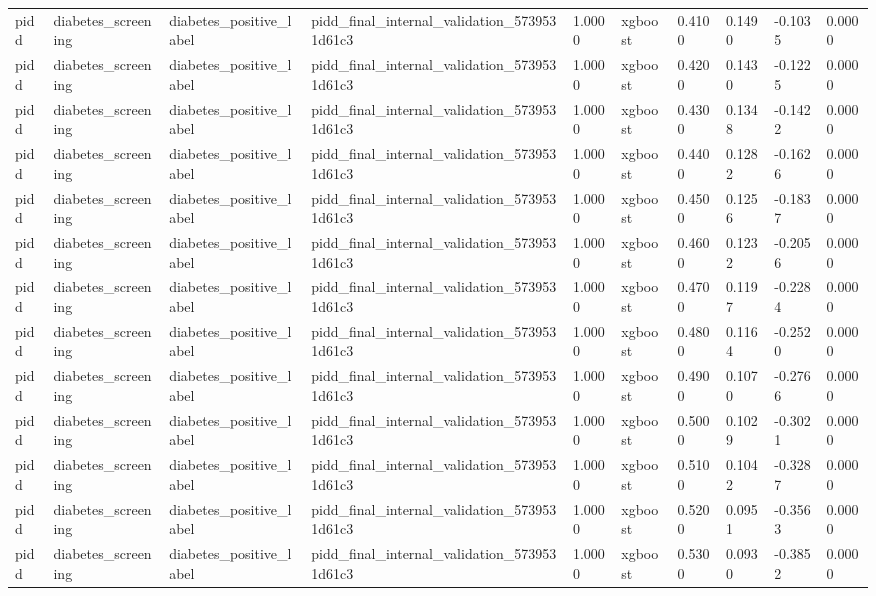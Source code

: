 \begin{tabular}{llllllllll}
pidd & diabetes\_screening & diabetes\_positive\_label & pidd\_final\_internal\_validation\_5739531d61c3 & 1.0000 & xgboost & 0.4100 & 0.1490 & -0.1035 & 0.0000 \\
pidd & diabetes\_screening & diabetes\_positive\_label & pidd\_final\_internal\_validation\_5739531d61c3 & 1.0000 & xgboost & 0.4200 & 0.1430 & -0.1225 & 0.0000 \\
pidd & diabetes\_screening & diabetes\_positive\_label & pidd\_final\_internal\_validation\_5739531d61c3 & 1.0000 & xgboost & 0.4300 & 0.1348 & -0.1422 & 0.0000 \\
pidd & diabetes\_screening & diabetes\_positive\_label & pidd\_final\_internal\_validation\_5739531d61c3 & 1.0000 & xgboost & 0.4400 & 0.1282 & -0.1626 & 0.0000 \\
pidd & diabetes\_screening & diabetes\_positive\_label & pidd\_final\_internal\_validation\_5739531d61c3 & 1.0000 & xgboost & 0.4500 & 0.1256 & -0.1837 & 0.0000 \\
pidd & diabetes\_screening & diabetes\_positive\_label & pidd\_final\_internal\_validation\_5739531d61c3 & 1.0000 & xgboost & 0.4600 & 0.1232 & -0.2056 & 0.0000 \\
pidd & diabetes\_screening & diabetes\_positive\_label & pidd\_final\_internal\_validation\_5739531d61c3 & 1.0000 & xgboost & 0.4700 & 0.1197 & -0.2284 & 0.0000 \\
pidd & diabetes\_screening & diabetes\_positive\_label & pidd\_final\_internal\_validation\_5739531d61c3 & 1.0000 & xgboost & 0.4800 & 0.1164 & -0.2520 & 0.0000 \\
pidd & diabetes\_screening & diabetes\_positive\_label & pidd\_final\_internal\_validation\_5739531d61c3 & 1.0000 & xgboost & 0.4900 & 0.1070 & -0.2766 & 0.0000 \\
pidd & diabetes\_screening & diabetes\_positive\_label & pidd\_final\_internal\_validation\_5739531d61c3 & 1.0000 & xgboost & 0.5000 & 0.1029 & -0.3021 & 0.0000 \\
pidd & diabetes\_screening & diabetes\_positive\_label & pidd\_final\_internal\_validation\_5739531d61c3 & 1.0000 & xgboost & 0.5100 & 0.1042 & -0.3287 & 0.0000 \\
pidd & diabetes\_screening & diabetes\_positive\_label & pidd\_final\_internal\_validation\_5739531d61c3 & 1.0000 & xgboost & 0.5200 & 0.0951 & -0.3563 & 0.0000 \\
pidd & diabetes\_screening & diabetes\_positive\_label & pidd\_final\_internal\_validation\_5739531d61c3 & 1.0000 & xgboost & 0.5300 & 0.0930 & -0.3852 & 0.0000 \\

\end{tabular}
